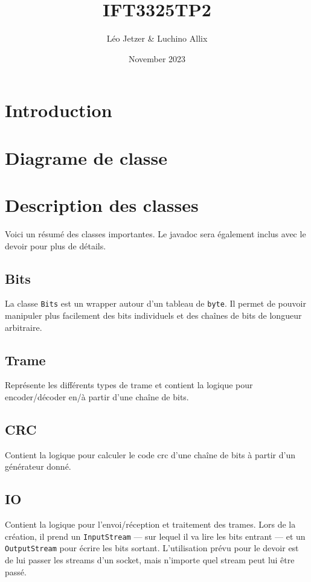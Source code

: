 \documentclass{article}
\title{IFT3325TP2}
\author{Léo Jetzer \& Luchino Allix}
\date{November 2023}
\begin{document}
\maketitle

\newcommand{\lt}{$<$}
\newcommand{\gt}{$>$}
\newcommand{\gen}[1]{$<$#1$>$}

\section{Introduction}
\section{Diagrame de classe}

\section{Description des classes}
    Voici un résumé des classes importantes. Le javadoc sera également inclus avec le devoir pour plus de détails.
    
    \subsection{Bits}
    La classe \verb#Bits# est un wrapper autour d'un tableau de \verb#byte#. Il permet de pouvoir manipuler plus facilement des bits individuels et des chaînes de bits de longueur arbitraire.
    
    \subsection{Trame}
    Représente les différents types de trame et contient la logique pour encoder/décoder en/à partir d'une chaîne de bits.
    
    \subsection{CRC}
    Contient la logique pour calculer le code crc d'une chaîne de bits à partir d'un générateur donné.
    
    \subsection{IO}
    Contient la logique pour l'envoi/réception et traitement des trames.
    Lors de la création, il prend un \verb#InputStream# --- sur lequel il va lire les bits entrant --- et un \verb#OutputStream# pour écrire les bits sortant. L'utilisation prévu pour le devoir est de lui passer les streams d'un socket, mais n'importe quel stream peut lui être passé.
\end{document}
